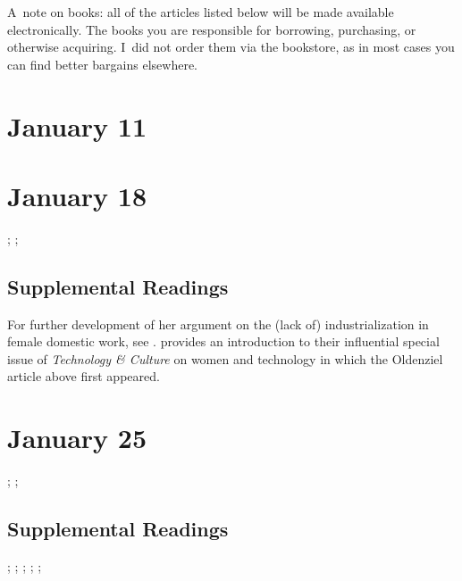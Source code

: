 \documentclass[11pt]{article}
\renewcommand{\cite}{\textcite}
\begin{document}
\noindent A~note on books: all of the articles listed below will be made available electronically.  The books you are responsible for borrowing, purchasing, or otherwise acquiring.  I~did not order them via the bookstore, as in most cases you can find better bargains elsewhere.

\small
\let\realeverypar\everypar
\realeverypar{\the\myeverypar\the\everypar}%
\newtoks\everypar %
\everypar{}
\newtoks\myeverypar \myeverypar{}

\myeverypar{\hangindent=1cm \small}

\section{January 11}



\section{January 18}

; ; 

\subsection{Supplemental Readings}

For further development of her argument on the (lack of) industrialization in female domestic work, see \cite{Cowan:1983vm}.  \cite{Lerman:1997ui} provides an introduction to their influential special issue of \emph{Technology \& Culture} on women and technology in which the Oldenziel article above first appeared.


\section{January 25}

; ; 

\subsection{Supplemental Readings}

\cite{Wajcman:2000vq}; \cite{Bray:1997wl}; \cite{Edwards:1990ua}; \cite{Pirsig:1974vs}; \cite{Ullman:1997vv}; \cite{Florman:1996um}
\end{document}

